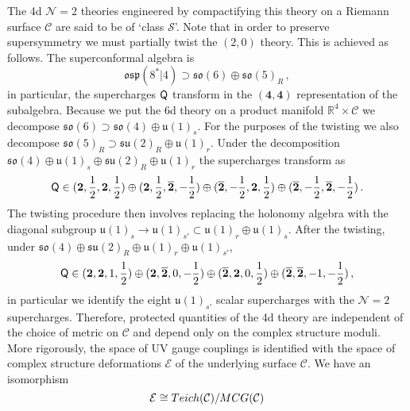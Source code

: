 \documentclass[main.tex]{subfiles}
\begin{document}
The 4d $\mathcal{N}=2$ theories engineered by compactifying this theory on a Riemann surface $\mathcal{C}$ are said to be of `class $\mathcal{S}$'.  Note that in order to preserve supersymmetry we must partially twist the $(2,0)$ theory.  This is achieved as follows.  The superconformal algebra is \cite{Kac:1977qb,Nahm:1977tg}
\begin{equation}
\mathfrak{osp}(8^*|4)\supset\mathfrak{so}(6)\oplus\mathfrak{so}(5)_R\,,
\end{equation}
in particular, the supercharges $\mathsf{Q}$ transform in the $(\mathbf{4},\mathbf{4})$ representation of the subalgebra.  Because we put the 6d theory on a product manifold $\mathbb{R}^4\times \mathcal{C}$ we decompose $\mathfrak{so}(6)\supset\mathfrak{so}(4)\oplus \mathfrak{u}(1)_s$.  For the purposes of the twisting we also decompose $\mathfrak{so}(5)_R\supset\mathfrak{su}(2)_R\oplus\mathfrak{u}(1)_r$.  Under the decomposition $\mathfrak{so}(4)\oplus \mathfrak{u}(1)_s\oplus\mathfrak{su}(2)_R\oplus\mathfrak{u}(1)_r$ the supercharges transform as
\begin{equation}
\mathsf{Q}\in(\mathbf{2},\frac{1}{2},\mathbf{2},\frac{1}{2})\oplus(\mathbf{2},\frac{1}{2},\overline{\mathbf{2}},-\frac{1}{2})\oplus(\overline{\mathbf{2}},-\frac{1}{2},\mathbf{2},\frac{1}{2})\oplus(\overline{\mathbf{2}},-\frac{1}{2},\overline{\mathbf{2}},-\frac{1}{2})\,.
\end{equation}
The twisting procedure then involves replacing the holonomy algebra with the diagonal subgroup $\mathfrak{u}(1)_s\to \mathfrak{u}(1)_{s'}\subset\mathfrak{u}(1)_r\oplus \mathfrak{u}(1)_s$.  After the twisting, under $\mathfrak{so}(4)\oplus\mathfrak{su}(2)_R\oplus\mathfrak{u}(1)_{r}\oplus\mathfrak{u}(1)_{s'}$,
\begin{equation}
\mathsf{Q}\in(\mathbf{2},\mathbf{2},1,\frac{1}{2})\oplus(\mathbf{2},\overline{\mathbf{2}},0,-\frac{1}{2})\oplus(\overline{\mathbf{2}},\mathbf{2},0,\frac{1}{2})\oplus(\overline{\mathbf{2}},\overline{\mathbf{2}},-1,-\frac{1}{2})\,,
\end{equation}
in particular we identify the eight $\mathfrak{u}(1)_{s'}$ scalar supercharges with the $\mathcal{N}=2$ supercharges.  Therefore, protected quantities of the 4d theory are independent of the choice of metric on $\mathcal{C}$ and depend only on the complex structure moduli.  More rigorously, the space of UV gauge couplings is identified with the space of complex structure deformations $\mathcal{E}$ of the underlying surface $\mathcal{C}$.  We have an isomorphism 
\begin{equation}
\mathcal{E}\cong Teich(\mathcal{C})/ MCG(\mathcal{C})
\end{equation}
\end{document}

